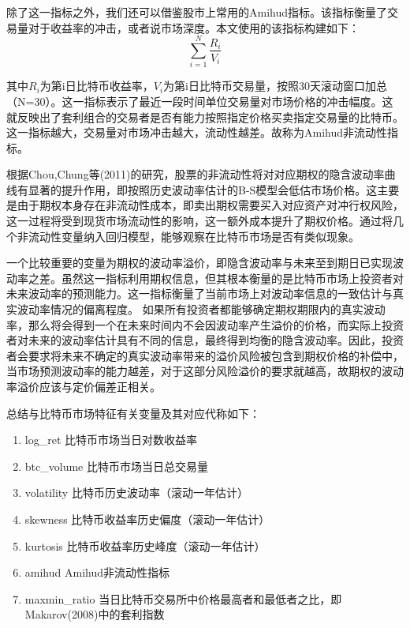 \par{
    除了这一指标之外，我们还可以借鉴股市上常用的Amihud指标\cite{Yako-2002}。该指标衡量了交易量对于收益率的冲击，或者说市场深度。本文使用的该指标构建如下：
}
\begin{equation}
    \sum_{i=1}^{N}{\frac{R_i}{V_i}}
\end{equation}
\par{
    其中$R_i$为第i日比特币收益率，$V_i$为第i日比特币交易量，按照30天滚动窗口加总（N=30）。这一指标表示了最近一段时间单位交易量对市场价格的冲击幅度。这就反映出了套利组合的交易者是否有能力按照指定价格买卖指定交易量的比特币。这一指标越大，交易量对市场冲击越大，流动性越差。故称为Amihud非流动性指标。
}
\par{
    根据Chou,Chung等(2011)的研究，股票的非流动性将对对应期权的隐含波动率曲线有显著的提升作用\cite{doi:10.1002/fut.20531}，即按照历史波动率估计的B-S模型会低估市场价格。这主要是由于期权本身存在非流动性成本，即卖出期权需要买入对应资产对冲行权风险，这一过程将受到现货市场流动性的影响，这一额外成本提升了期权价格。通过将几个非流动性变量纳入回归模型，能够观察在比特币市场是否有类似现象。
}
\par{
    一个比较重要的变量为期权的波动率溢价，即隐含波动率与未来至到期日已实现波动率之差。虽然这一指标利用期权信息，但其根本衡量的是比特币市场上投资者对未来波动率的预测能力。这一指标衡量了当前市场上对波动率信息的一致估计与真实波动率情况的偏离程度。 如果所有投资者都能够确定期权期限内的真实波动率，那么将会得到一个在未来时间内不会因波动率产生溢价的价格，而实际上投资者对未来的波动率估计具有不同的信息，最终得到均衡的隐含波动率。因此，投资者会要求将未来不确定的真实波动率带来的溢价风险被包含到期权价格的补偿中，当市场预测波动率的能力越差，对于这部分风险溢价的要求就越高，故期权的波动率溢价应该与定价偏差正相关。
}
\par{总结与比特币市场特征有关变量及其对应代称如下：}
\begin{enumerate}[(1)]
\item log\_ret 比特币市场当日对数收益率
\item btc\_volume 比特币市场当日总交易量
\item volatility 比特币历史波动率（滚动一年估计）
\item skewness 比特币收益率历史偏度（滚动一年估计）
\item kurtosis 比特币收益率历史峰度（滚动一年估计）
\item amihud Amihud非流动性指标
\item maxmin\_ratio 当日比特币交易所中价格最高者和最低者之比，即Makarov(2008)中的套利指数\cite{Makarov-2018}
\end{enumerate}
